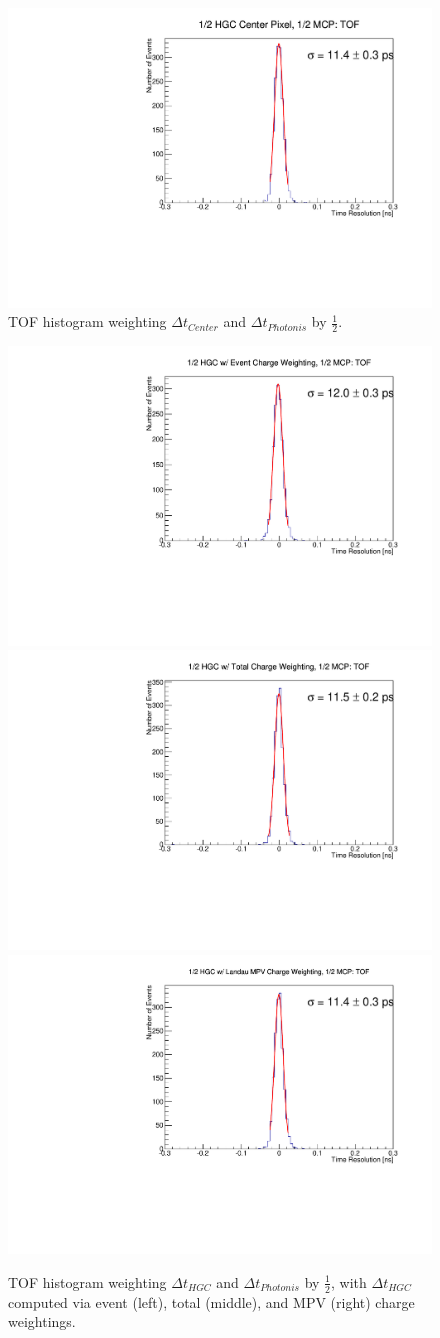 \documentclass[twocolumn,aps,prd,reprint,superscriptaddress,floatfix]{revtex4-1}
\begin{document}
\begin{figure}[!htbp]
	\centering
	\includegraphics[width=\linewidth]{deltaT_Center_MCP_Equal104.pdf}
	\caption{TOF histogram weighting $\Delta t_{Center}$ and $\Delta t_{Photonis}$ by $\frac{1}{2}$.}
	\label{fig:CenterMCPEqual104}
\end{figure}


\begin{figure}[!htbp]
	\centering
	\includegraphics[width=.32\textwidth]{deltaT_PicoSilEventCharge_MCP_Equal104.pdf}
	\includegraphics[width=.32\textwidth]{deltaT_PicoSilTotalCharge_MCP_Equal104.pdf}
	\includegraphics[width=.32\textwidth]{deltaT_PicoSilLandauCharge_MCP_Equal104.pdf}
	\caption{TOF histogram weighting $\Delta t_{HGC}$ and $\Delta t_{Photonis}$ by $\frac{1}{2}$, with $\Delta t_{HGC}$ computed via event (left), total (middle), and MPV (right) charge weightings.}
	\label{fig:HGCMCP_event_total_MPV_104}
\end{figure}
\end{document}
